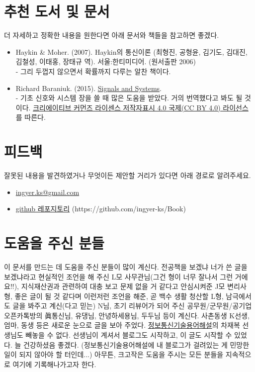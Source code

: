 \section{추천 도서 및 문서}
더 자세하고 정확한 내용을 원한다면 아래 문서와 책들을 참고하면 좋겠다.
\begin{itemize}
    \item Haykin \& Moher. (2007). Haykin의 통신이론 (최형진, 공형윤, 김기도, 김대진, 김철성, 이태홍, 장태규 역). 서울:한티미디어. (원서출판 2006) \\
    - 그리 두껍지 않으면서 확률까지 다루는 알찬 책이다.
    \item Richard Baraniuk. (2015). \href{https://cnx.org/contents/77608400-65b9-4f03-8a5f-536c611866bb@15.4/Signals-and-Systems}{Signals and Systems}. \\
    - 기초 신호와 시스템 장을 쓸 때 많은 도움을 받았다. 거의 번역했다고 봐도 될 것이다. \href{https://creativecommons.org/licenses/by/4.0/deed.ko}{크리에이티브 커먼즈 라이센스 저작자표시 4.0 국제(CC BY 4.0) 라이선스}를 따른다.
\end{itemize}

\section{피드백}
잘못된 내용을 발견하였거나 무엇이든 제안할 거리가 있다면 아래 경로로 알려주세요.
\begin{itemize}
    \item \href{mailto:ingyer.ks@gmail.com}{ingyer.ks@gmail.com}
    \item \href{https://github.com/ingyer-ks/Book}{github 레포지토리} (https://github.com/ingyer-ks/Book)
\end{itemize}
\section{도움을 주신 분들}
이 문서를 만드는 데 도움을 주신 분들이 많이 계신다.
전공책을 보겠냐 너가 쓴 글을 보겠냐라고 현실적인 조언을 해 주신 L모 사무관님(그건 형이 너무 잘나서 그런 거에요!!),
지식재산권과 관련하여 대충 보고 문제 없을 거 같다고 안심시켜준 J모 변리사 형, 좋은 글이 될 것 같다며 이런저런 조언을 해준, 곧 백수 생활 청산할 L형, 
남극에서도 글을 봐주고 계신(다고 믿는) N님, 초기 리뷰어가 되어 주신 공무원/군무원/공기업 오픈카톡방의 眞통신님, 유댕님, 안녕하세용님, 두두님 등이 계신다.
사촌동생 K선생, 엄마, 동생 등은 새로운 눈으로 글을 보아 주었다.
\href{http://www.ktword.co.kr/}{정보통신기술용어해설}의 차재복 선생님도 빼놓을 수 없다. 선생님이 계셔서 블로그도 시작하고, 이 글도 시작할 수 있었다. 늘 건강하셨음 좋겠다.
(정보통신기술용어해설에 내 블로그가 걸려있는 게 민망한 일이 되지 않아야 할 터인데...)
아무튼, 크고작은 도움을 주시는 모든 분들을 지속적으로 여기에 기록해나가고자 한다.

